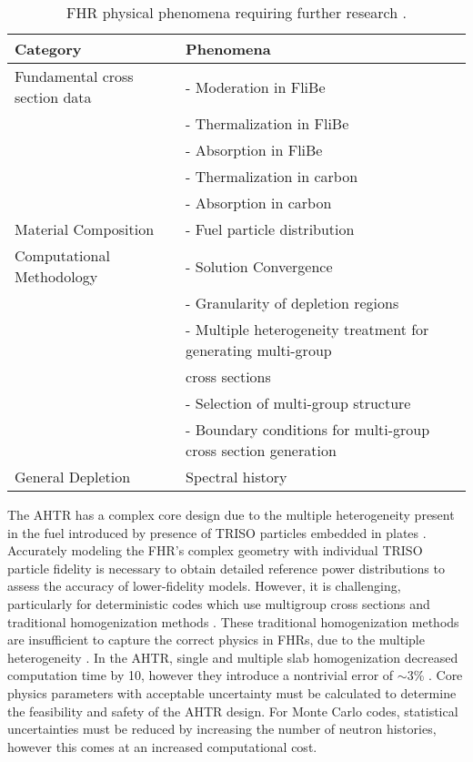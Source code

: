 \begin{table}[]
    \centering
    \onehalfspacing
    \caption{\gls{FHR} physical phenomena requiring further research 
    \cite{rahnema_phenomena_2019}.}
	\label{tab:phenomena}
    \small
    \begin{tabular}{l|l}
    \hline
    \textbf{Category} & \textbf{Phenomena} \\ \hline
    Fundamental cross section data & - Moderation in FliBe \\
    & - Thermalization in FliBe \\
    & - Absorption in FliBe \\
    & - Thermalization in carbon \\
    & - Absorption in carbon \\ \hline
    Material Composition & - Fuel particle distribution \\ \hline
    Computational Methodology & - Solution Convergence \\ 
    & - Granularity of depletion regions \\
    & - Multiple heterogeneity treatment for generating multi-group \\ 
    & cross sections \\
    & - Selection of multi-group structure \\
    & - Boundary conditions for multi-group cross section generation \\ \hline 
    General Depletion & Spectral history \\ \hline 
    \end{tabular}
    \end{table}

The \gls{AHTR} has a complex core design due to the multiple heterogeneity present 
in the fuel introduced by presence of \gls{TRISO} particles embedded in plates 
\cite{ramey_monte_2018,rahnema_phenomena_2019}.
Accurately modeling the \gls{FHR}'s complex geometry with individual \gls{TRISO}
particle fidelity is necessary to obtain detailed reference power distributions 
to assess the accuracy of lower-fidelity models.
However, it is challenging, particularly for deterministic codes which 
use multigroup cross sections and traditional homogenization methods
\cite{ramey_monte_2018}. 
These traditional homogenization methods are insufficient to capture the correct physics 
in \glspl{FHR}, due to the multiple heterogeneity \cite{ramey_monte_2018}. 
In the \gls{AHTR}, single and multiple slab homogenization decreased computation time 
by 10, however they introduce a nontrivial error of $\sim$3\%
\cite{ramey_monte_2018,cisneros_neutronics_2012}.
Core physics parameters with acceptable uncertainty must be calculated to determine 
the feasibility and safety of the \gls{AHTR} design.
For Monte Carlo codes, statistical uncertainties must be reduced by increasing 
the number of neutron histories, however this comes at an increased 
computational cost.

